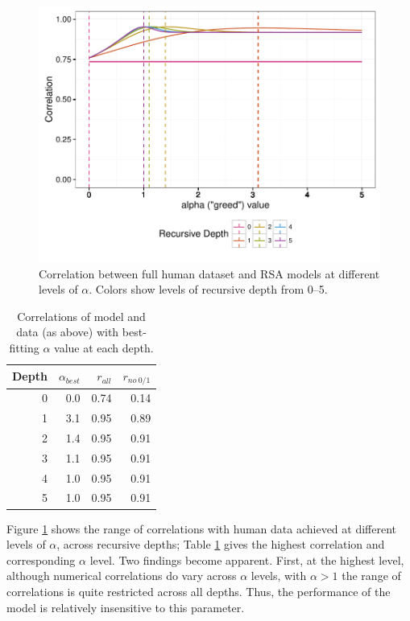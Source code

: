 \documentclass[man,noapacite]{apa2}
\begin{document}
\begin{figure}[t]
 \centering
 \includegraphics[width=5in]{../plots/alpha-fit.pdf}
 \caption{\label{fig:alpha-fit} Correlation between full human dataset and RSA models at different levels of $\alpha$. Colors show levels of recursive depth from 0--5.}
\end{figure}

\begin{table}[ht]
\centering
\begin{tabular}{rrrr}
  \hline
Depth & $\alpha_{best}$ & $r_{all}$ & $r_{no~0/1}$ \\
  \hline
  0 & 0.0 & 0.74 & 0.14 \\
    1 & 3.1 & 0.95 & 0.89 \\
    2 & 1.4 & 0.95 & 0.91 \\
    3 & 1.1 & 0.95 & 0.91 \\
    4 & 1.0 & 0.95 & 0.91 \\
    5 & 1.0 & 0.95 & 0.91 \\
   \hline
\end{tabular}
\caption{\label{tab:corrs-fita} Correlations of model and data (as above) with best-fitting $\alpha$ value at each depth.}
\end{table}

Figure \ref{fig:alpha-fit} shows the range of correlations with human data achieved at different levels of $\alpha$, across recursive depths; Table \ref{tab:corrs-fita} gives the highest correlation and corresponding $\alpha$ level. Two findings become apparent. First, at the highest level, although numerical correlations do vary across $\alpha$ levels, with $\alpha > 1$ the range of correlations is quite restricted across all depths. Thus, the performance of the model is relatively insensitive to this parameter.
\end{document}
